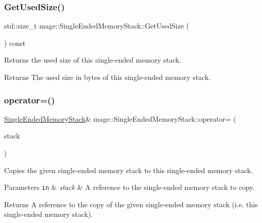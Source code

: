 \subsubsection{\texorpdfstring{Get\+Used\+Size()}{GetUsedSize()}}
{\footnotesize\ttfamily std\+::size\+\_\+t mage\+::\+Single\+Ended\+Memory\+Stack\+::\+Get\+Used\+Size (\begin{DoxyParamCaption}{ }\end{DoxyParamCaption}) const\hspace{0.3cm}{\ttfamily [noexcept]}}

Returns the used size of this single-\/ended memory stack.

\begin{DoxyReturn}{Returns}
The used size in bytes of this single-\/ended memory stack. 
\end{DoxyReturn}
\mbox{\label{classmage_1_1_single_ended_memory_stack_a709db7d21cd2db6e98acd7985770468e}} 
\subsubsection{\texorpdfstring{operator=()}{operator=()}\hspace{0.1cm}{\footnotesize\ttfamily [1/2]}}
{\footnotesize\ttfamily \mbox{\hyperlink{classmage_1_1_single_ended_memory_stack}{Single\+Ended\+Memory\+Stack}}\& mage\+::\+Single\+Ended\+Memory\+Stack\+::operator= (\begin{DoxyParamCaption}\item[{const \mbox{\hyperlink{classmage_1_1_single_ended_memory_stack}{Single\+Ended\+Memory\+Stack}} \&}]{stack }\end{DoxyParamCaption})\hspace{0.3cm}{\ttfamily [delete]}}

Copies the given single-\/ended memory stack to this single-\/ended memory stack.


\begin{DoxyParams}[1]{Parameters}
\mbox{\tt in}  & {\em stack} & A reference to the single-\/ended memory stack to copy. \\
\hline
\end{DoxyParams}
\begin{DoxyReturn}{Returns}
A reference to the copy of the given single-\/ended memory stack (i.\+e. this single-\/ended memory stack). 
\end{DoxyReturn}
\mbox{\label{classmage_1_1_single_ended_memory_stack_a24613dc91ab6577aa57fbd55a4c81023}} 
